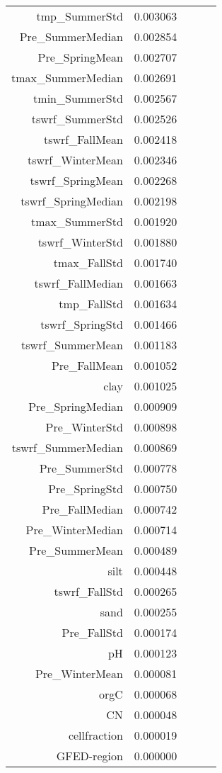 \begin{tabular}{rrrrr}
tmp_SummerStd & 0.003063 \\
Pre_SummerMedian & 0.002854 \\
Pre_SpringMean & 0.002707 \\
tmax_SummerMedian & 0.002691 \\
tmin_SummerStd & 0.002567 \\
tswrf_SummerStd & 0.002526 \\
tswrf_FallMean & 0.002418 \\
tswrf_WinterMean & 0.002346 \\
tswrf_SpringMean & 0.002268 \\
tswrf_SpringMedian & 0.002198 \\
tmax_SummerStd & 0.001920 \\
tswrf_WinterStd & 0.001880 \\
tmax_FallStd & 0.001740 \\
tswrf_FallMedian & 0.001663 \\
tmp_FallStd & 0.001634 \\
tswrf_SpringStd & 0.001466 \\
tswrf_SummerMean & 0.001183 \\
Pre_FallMean & 0.001052 \\
clay & 0.001025 \\
Pre_SpringMedian & 0.000909 \\
Pre_WinterStd & 0.000898 \\
tswrf_SummerMedian & 0.000869 \\
Pre_SummerStd & 0.000778 \\
Pre_SpringStd & 0.000750 \\
Pre_FallMedian & 0.000742 \\
Pre_WinterMedian & 0.000714 \\
Pre_SummerMean & 0.000489 \\
silt & 0.000448 \\
tswrf_FallStd & 0.000265 \\
sand & 0.000255 \\
Pre_FallStd & 0.000174 \\
pH & 0.000123 \\
Pre_WinterMean & 0.000081 \\
orgC & 0.000068 \\
CN & 0.000048 \\
cellfraction & 0.000019 \\
GFED-region & 0.000000 \\
\bottomrule
\end{tabular}
